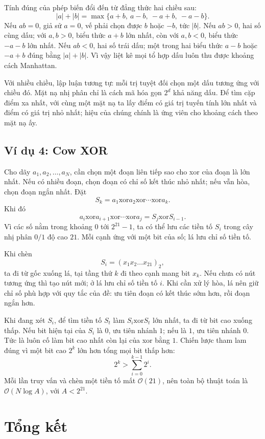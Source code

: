 \documentclass[11pt]{article}
\newcommand{\Oh}{\mathcal{O}}
\newcommand{\xor}{\mathbin{\mathrm{xor}}}
\begin{document}
Tính đúng của phép biến đổi đến từ đẳng thức hai chiều sau:
\[
  |a|+|b|=\max\{a+b,\ a-b,\ -a+b,\ -a-b\}.
\]
Nếu \(ab=0\), giả sử \(a=0\), vế phải chọn được \(b\) hoặc \(-b\), tức
\(|b|\). Nếu \(ab>0\), hai số cùng dấu; với \(a,b>0\), biểu thức \(a+b\) lớn
nhất, còn với \(a,b<0\), biểu thức \(-a-b\) lớn nhất. Nếu \(ab<0\), hai số
trái dấu; một trong hai biểu thức \(a-b\) hoặc \(-a+b\) đúng bằng
\(|a|+|b|\). Vì vậy liệt kê mọi tổ hợp dấu luôn thu được khoảng cách
Manhattan.

Với nhiều chiều, lập luận tương tự: mỗi trị tuyệt đối chọn một dấu tương ứng
với chiều đó. Mặt nạ nhị phân chỉ là cách mã hóa gọn \(2^d\) khả năng dấu.
Để tìm cặp điểm xa nhất, với cùng một mặt nạ ta lấy điểm có giá trị tuyến tính
lớn nhất và điểm có giá trị nhỏ nhất; hiệu của chúng chính là ứng viên cho
khoảng cách theo mặt nạ ấy.

\subsection{Ví dụ 4: Cow XOR}

Cho dãy \(a_1,a_2,\ldots,a_N\), cần chọn một đoạn liên tiếp sao cho xor của
đoạn là lớn nhất. Nếu có nhiều đoạn, chọn đoạn có chỉ số kết thúc nhỏ nhất;
nếu vẫn hòa, chọn đoạn ngắn nhất. Đặt
\[
  S_k=a_1\xor a_2\xor\cdots\xor a_k.
\]
Khi đó
\[
  a_i\xor a_{i+1}\xor\cdots\xor a_j=S_j\xor S_{i-1}.
\]
Vì các số nằm trong khoảng \(0\) tới \(2^{21}-1\), ta có thể lưu các tiền tố
\(S_i\) trong cây nhị phân \(0/1\) độ cao \(21\). Mỗi cạnh ứng với một bit
của số; lá lưu chỉ số tiền tố.

Khi chèn
\[
  S_i=(x_1x_2\ldots x_{21})_2,
\]
ta đi từ gốc xuống lá, tại tầng thứ \(k\) đi theo cạnh mang bit \(x_k\). Nếu
chưa có nút tương ứng thì tạo nút mới; ở lá lưu chỉ số tiền tố \(i\). Khi cần
xử lý hòa, lá nên giữ chỉ số phù hợp với quy tắc của đề: ưu tiên đoạn có kết
thúc sớm hơn, rồi đoạn ngắn hơn.

Khi đang xét \(S_i\), để tìm tiền tố \(S_t\) làm \(S_i\xor S_t\) lớn nhất,
ta đi từ bit cao xuống thấp. Nếu bit hiện tại của \(S_i\) là \(0\), ưu tiên
nhánh \(1\); nếu là \(1\), ưu tiên nhánh \(0\). Tức là luôn cố làm bit cao
nhất còn lại của xor bằng \(1\). Chiến lược tham lam đúng vì một bit cao
\(2^k\) lớn hơn tổng mọi bit thấp hơn:
\[
  2^k>\sum_{i=0}^{k-1}2^i.
\]
Mỗi lần truy vấn và chèn một tiền tố mất \(\Oh(21)\), nên toàn bộ thuật toán
là \(\Oh(N\log A)\), với \(A<2^{21}\).

\section{Tổng kết}
\end{document}
